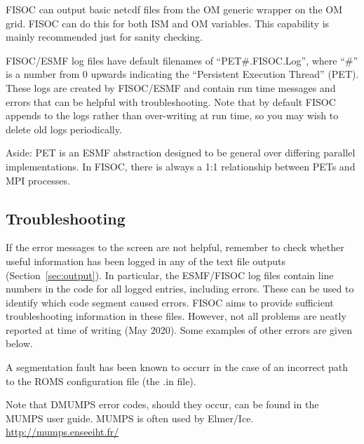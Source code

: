 \documentclass[11pt]{article}
\begin{document}
FISOC can output basic netcdf files from the OM generic wrapper 
on the OM grid. 
FISOC can do this for both ISM and OM variables.
This capability is mainly recommended just for sanity checking.


FISOC/ESMF log files have default filenames of ``PET\#.FISOC.Log'', where ``\#'' is a number from 0 upwards 
indicating the ``Persistent Execution Thread'' (PET). 
These logs are created by FISOC/ESMF and contain run time messages and errors that can 
be helpful with troubleshooting.
Note that by default FISOC appends to the logs rather than over-writing at run time, so you may wish to delete 
old logs periodically. 

Aside: PET is an ESMF abstraction designed to be general over differing parallel implementations. 
In FISOC, there is always a 1:1 relationship between PETs and MPI processes. 





\subsection{Troubleshooting}

If the error messages to the screen are not helpful, remember to check whether useful 
information has been logged in any of the text file outputs (Section~\ref{sec:output}).
In particular, the ESMF/FISOC log files contain line numbers in the 
code for all logged entries, including errors. 
These can be used to identify which code segment caused errors. 
FISOC aims to provide sufficient troubleshooting information in these files.
However, not all problems are neatly reported at time of writing (May 2020).
Some examples of other errors are given below.

A segmentation fault has been known to occurr in the case of an incorrect path to the ROMS 
configuration file (the .in file). 

Note that DMUMPS error codes, should they occur, can be found in the MUMPS user guide.
MUMPS is often used by Elmer/Ice.
\url{http://mumps.enseeiht.fr/}
\end{document}
